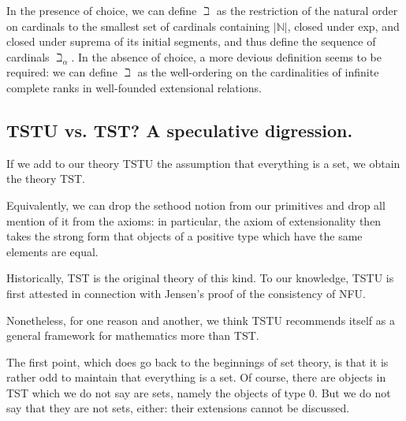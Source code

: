 \documentclass[12pt]{article}
\begin{document}
In the presence of choice, we can define $\beth$ as the restriction of the natural order on cardinals to the smallest set of cardinals containing $|\mathbb N|$, closed under exp, and closed under suprema of its initial segments,
and thus define the sequence of cardinals $\beth_\alpha$.  In the absence of choice, a more devious definition seems to be required:  we can define $\beth$ as the well-ordering on the cardinalities of infinite complete ranks in well-founded extensional relations.

\subsection{TSTU vs. TST?  A speculative digression.}

If we add to our theory TSTU the assumption that everything is a set, we obtain the theory TST.

Equivalently, we can drop the sethood notion from our primitives and drop all mention of it from the axioms:  in particular, the axiom of extensionality then takes the strong form that objects of a positive type which have the same elements
are equal.

Historically, TST is the original theory of this kind.   To our knowledge, TSTU  is first attested in connection with Jensen's proof of the consistency of NFU.

Nonetheless, for one reason and another, we think TSTU recommends itself as a general framework for mathematics more than TST.

The first point, which does go back to the beginnings of set theory, is that it is rather odd to maintain that everything is a set.  Of course, there are objects in TST which we do not say are sets, namely the objects of type 0.  But we do not say that they are not sets, either:  their extensions cannot be discussed.
\end{document}
